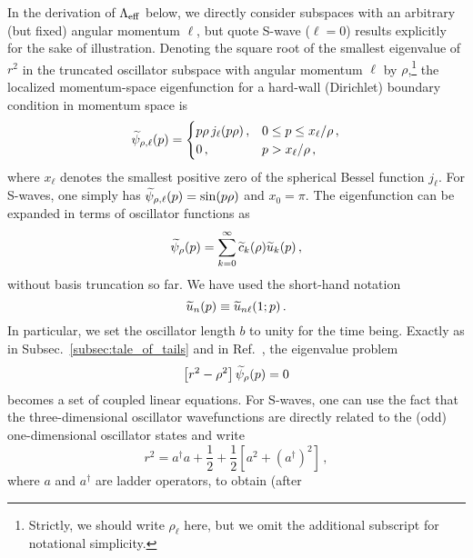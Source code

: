   In the derivation of $\Lambda_{\rm eff}$ below, we directly consider
  subspaces with an arbitrary (but fixed) angular momentum $\ell$, but
  quote S-wave ($\ell=0$) results explicitly for the sake of
  illustration.  Denoting the square root of the smallest eigenvalue
  of $r^2$ in the truncated oscillator subspace with angular momentum
  $\ell$ by $\rho$,\footnote{Strictly, we should write $\rho_\ell$ here,
  but we omit the additional subscript for notational simplicity.} the
  localized momentum-space eigenfunction for a hard-wall (Dirichlet)
  boundary condition in momentum space is
  \begin{equation}
   \widetilde{\psi}_{\rho,\ell}(p) =
   \begin{cases}
    p\rho\,j_\ell(p\rho) \,, & 0 \leq p \leq x_\ell/\rho \,, \\
    0 \,, & p > x_\ell/\rho \,,
   \end{cases}
  \label{eq:psi-rho-ell}
  \end{equation}
  where $x_\ell$ denotes the smallest positive zero of the spherical
  Bessel function $j_\ell$.  For S-waves, one simply has
  $\widetilde{\psi}_{\rho,\ell}(p)=\sin(p\rho)$ and $x_0=\pi$.
  The eigenfunction can be expanded in terms of oscillator functions as
  \begin{equation}
   \widetilde{\psi}_\rho(p)
   = \sum_{k=0}^\infty \widetilde{c}_k(\rho) \widetilde{u}_{k}(p) \,,
  \label{eq:psi-rho-exp}
  \end{equation}
  without basis truncation so far.  We have used the short-hand
  notation
  \begin{equation}
   \widetilde{u}_n(p) \equiv \widetilde{u}_{n\ell}(1;p) \,.
  \label{eq:u-tilde}
  \end{equation}
  In particular, we set the oscillator length $b$ to unity for the time
  being.  Exactly as in Subsec.~\ref{subsec:tale_of_tails} and in
  Ref.~\cite{More:2013rma}, the eigenvalue problem
  \begin{equation}
   \left[r^2-\rho^2\right]\widetilde{\psi}_\rho(p) = 0
  \label{eq:r2rho2-psi}
  \end{equation}
  becomes a set of coupled linear equations.  For S-waves, one can use
  the fact that the three-dimensional oscillator wavefunctions are
  directly related to the (odd) one-dimensional oscillator states and
  write
  \begin{equation}
   r^2 = a^\dagger a + \frac{1}{2}
   + \frac{1}{2}\left[a^2+(a^\dagger)^2\right] \,,
  \label{eq:r2}
  \end{equation}
  where $a$ and $a^\dagger$ are ladder operators, to obtain (after
